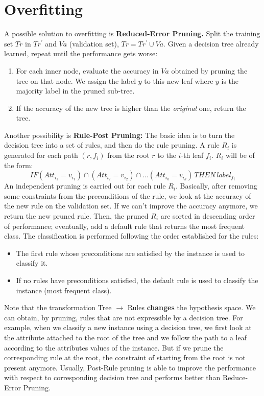 \section{Overfitting}
A possible solution to overfitting is \textbf{Reduced-Error Pruning.}\newline\newline
Split the training set $Tr$ in $Tr^{'}$ and $Va$ (validation set), $Tr = Tr^{'} \cup Va$. Given a decision tree already learned, repeat until the performance gets worse:
\begin{enumerate}
    \item For each inner node, evaluate the accuracy in $Va$ obtained by pruning the tree on that node. We assign the label $y$ to this new leaf where $y$ is the majority label in the pruned sub-tree.
    \item If the accuracy of the new tree is higher than the \textit{original} one, return the tree.
\end{enumerate}
Another possibility is \textbf{Rule-Post Pruning:}\newline\newline
The basic idea is to turn the decision tree into a set of rules, and then do the rule pruning. A rule $R_{i}$ is generated for each path $(r, f_{i})$ from the root $r$ to the $i$-th leaf $f_{i}$. $R_{i}$ will be of the form:
\[IF(Att_{i_{1}} = v_{i_{1}}) \cap (Att_{i_{2}} = v_{i_{2}}) \cap ... (Att_{i_{k}} = v_{i_{k}}) \, THEN \, label_{f_{i}}\]
An independent pruning is carried out for each rule $R_{i}$. Basically, after removing some constraints from the preconditions of the rule, we look at the accuracy of the new rule on the validation set. If we can't improve the accuracy anymore, we return the new pruned rule. Then, the pruned $R_{i}$ are sorted in descending order of performance; eventually, add a default rule that returns the most frequent class.\newline\newline
The classification is performed following the order established for the rules:
\begin{itemize}
    \item The first rule whose preconditions are satisfied by the instance is used to classify it.
    \item If no rules have preconditions satisfied, the default rule is used to classify the instance (most frequent class).
\end{itemize}
Note that the transformation Tree $\rightarrow$ Rules \textbf{changes} the hypothesis space. We can obtain, by pruning, rules that are not expressible by a decision tree. For example, when we classify a new instance using a decision tree, we first look at the attribute attached to the root of the tree and we follow the path to a leaf according to the attributes values of the instance. But if we prune the corresponding rule at the root, the constraint of starting from the root is not present anymore.\newline\newline
Usually, Post-Rule pruning is able to improve the performance with respect to corresponding decision tree and performs better than Reduce-Error Pruning. 
